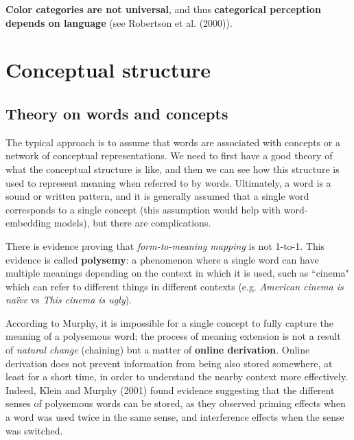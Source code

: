 \textbf{Color categories are not universal}, and thus \textbf{categorical perception depends on language} (see \notetv Robertson et al. (2000)).


\section{Conceptual structure}
\label{sec:conceptual_structure}

\subsection{Theory on words and concepts}
The typical approach is to assume that words are associated with concepts or a network of conceptual representations.
We need to first have a good theory of what the conceptual structure is like, and then we can see how this structure is used to represent meaning when referred to by words.
Ultimately, a word is a sound or written pattern, and it is generally assumed that a single word corresponds to a single concept (this assumption would help with word-embedding models), but there are complications.

There is evidence proving that \textit{form-to-meaning mapping} is not 1-to-1. This evidence is called \textbf{polysemy}: a phenomenon where a single word can have multiple meanings depending on the context in which it is used, such as ``cinema" which can refer to different things in different contexts (e.g. \textit{American cinema is naïve} vs \textit{This cinema is ugly}).

According to Murphy, it is impossible for a single concept to fully capture the meaning of a polysemous word; the process of meaning extension is not a result of \textit{natural change} (chaining) but a matter of \textbf{online derivation}. Online derivation does not prevent information from being also stored somewhere, at least for a short time, in order to understand the nearby context more effectively. Indeed, Klein and Murphy (2001) found evidence suggesting that the different senses of polysemous words can be stored, as they observed priming effects when a word was used twice in the same sense, and interference effects when the sense was switched.

